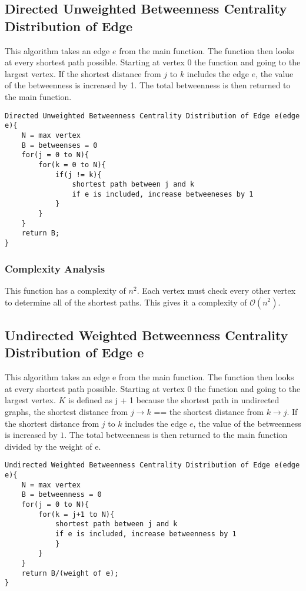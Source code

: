\documentclass{article}
\begin{document}
\subsection{Directed Unweighted Betweenness Centrality Distribution of Edge}
This algorithm takes an edge $e$ from the main function. The function then looks at every shortest path possible. Starting at vertex $0$ the function and going to the largest vertex. If the shortest distance from $j$ to $k$ includes the edge $e$, the value of the betweenness is increased by 1. The total betweenness is then returned to the main function.

\begin{verbatim}
Directed Unweighted Betweenness Centrality Distribution of Edge e(edge e){
    N = max vertex
    B = betweenses = 0
    for(j = 0 to N){
        for(k = 0 to N){
            if(j != k){
                shortest path between j and k
                if e is included, increase betweeneses by 1
            }
        }
    }
    return B;
}
\end{verbatim}

\subsubsection{Complexity Analysis}
This function has a complexity of $n^2$. Each vertex must check every other vertex to determine
all of the shortest paths. This gives it a complexity of $\mathcal{O}(n^2)$.

\subsection{Undirected Weighted Betweenness Centrality Distribution of Edge e}
This algorithm takes an edge e from the main function. The function then looks at every shortest path possible. Starting at vertex $0$ the function and going to the largest vertex. $K$ is defined as j + 1 because the shortest path in undirected graphs, the shortest distance from $j \rightarrow k$ == the shortest distance from $k \rightarrow j$. If the shortest distance from $j$ to $k$ includes the edge $e$, the value of the betweenness is increased by $1$. The total betweenness is then returned to the main function divided by the weight of e.

\begin{verbatim}
Undirected Weighted Betweenness Centrality Distribution of Edge e(edge e){
    N = max vertex
    B = betweenness = 0
    for(j = 0 to N){
        for(k = j+1 to N){
            shortest path between j and k
            if e is included, increase betweenness by 1
            }
        }
    }
    return B/(weight of e);
}
\end{verbatim}
\end{document}
